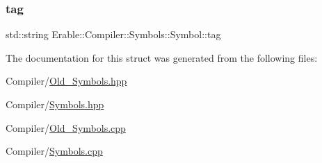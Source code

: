 \mbox{\label{class_erable_1_1_compiler_1_1_symbols_1_1_symbol_a09df8dce9bee3576451b880fc651506d}} 
\subsubsection{\texorpdfstring{tag}{tag}}
{\footnotesize\ttfamily std\+::string Erable\+::\+Compiler\+::\+Symbols\+::\+Symbol\+::tag}



The documentation for this struct was generated from the following files\+:\begin{DoxyCompactItemize}
\item 
Compiler/\mbox{\hyperlink{_old___symbols_8hpp}{Old\+\_\+\+Symbols.\+hpp}}\item 
Compiler/\mbox{\hyperlink{_symbols_8hpp}{Symbols.\+hpp}}\item 
Compiler/\mbox{\hyperlink{_old___symbols_8cpp}{Old\+\_\+\+Symbols.\+cpp}}\item 
Compiler/\mbox{\hyperlink{_symbols_8cpp}{Symbols.\+cpp}}\end{DoxyCompactItemize}
